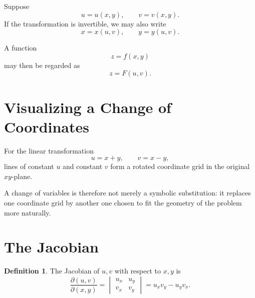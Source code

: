 \documentclass[11pt,oneside]{book}
\theoremstyle{studentthm}
\theoremstyle{definition}
\newtheorem{definition}[theorem]{Definition}
\begin{document}
Suppose
\[
u=u(x,y),
\qquad
v=v(x,y).
\]
If the transformation is invertible, we may also write
\[
x=x(u,v),
\qquad
y=y(u,v).
\]

A function
\[
z=f(x,y)
\]
may then be regarded as
\[
z=F(u,v).
\]


\section{Visualizing a Change of Coordinates}

For the linear transformation
\[
u=x+y,\qquad v=x-y,
\]
lines of constant \(u\) and constant \(v\) form a rotated coordinate
grid in the original \(xy\)-plane.

\begin{center}
\end{center}

A change of variables is therefore not merely a symbolic
substitution: it replaces one coordinate grid by another one chosen to
fit the geometry of the problem more naturally.


\section{The Jacobian}

\begin{definition}
The Jacobian of \(u,v\) with respect to \(x,y\) is
\[
\frac{\partial(u,v)}{\partial(x,y)}
=
\begin{vmatrix}
u_x&u_y\\
v_x&v_y
\end{vmatrix}
=
u_xv_y-u_yv_x.
\]
\end{definition}
\end{document}

